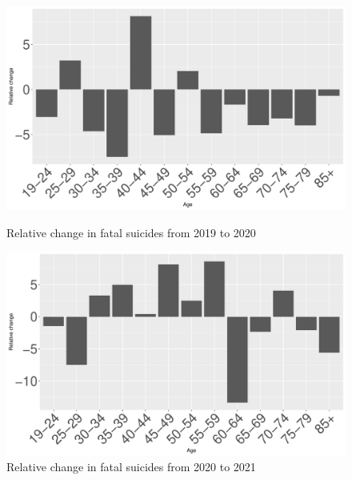 \documentclass{article}
\begin{document}
%
%
\begin{figure}[H]
	\begin{minipage}{0.45\textwidth}
		\includegraphics[width=\textwidth]{imgs/pl-fat-19_85-19_20.pdf}
		\caption{Relative change in fatal suicides from 2019 to 2020}
		\label{fig:pl-fat-19_85-19_20}
	\end{minipage}
	\hfill
	\begin{minipage}{0.45\textwidth}
		\includegraphics[width=\textwidth]{imgs/pl-fat-19_85-20_21.pdf}
		\caption{Relative change in fatal suicides from 2020 to 2021}
		\label{fig:pl-fat-19_85-20_21}
	\end{minipage}
\end{figure}
%
%
%
\end{document}
